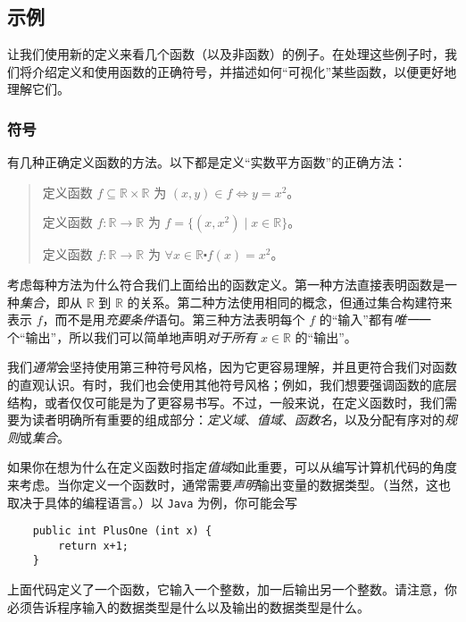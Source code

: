 
\subsection{示例}

让我们使用新的定义来看几个函数（以及非函数）的例子。在处理这些例子时，我们将介绍定义和使用函数的正确符号，并描述如何``可视化''某些函数，以便更好地理解它们。

\subsubsection*{符号}

有几种正确定义函数的方法。以下都是定义``实数平方函数''的正确方法：
\begin{quotation}
    定义函数 $f \subseteq \mathbb{R} \times \mathbb{R}$ 为 $(x, y) \in f \iff y = x^2$。

    定义函数 $f : \mathbb{R} \to \mathbb{R}$ 为 $f=\big\{(x,x^2) \mid x \in \mathbb{R}\big\}$。

    定义函数 $f : \mathbb{R} \to \mathbb{R}$ 为 $\forall x \in \mathbb{R} \centerdot f(x) = x^2$。
\end{quotation}
考虑每种方法为什么符合我们上面给出的函数定义。第一种方法直接表明函数是一种\emph{集合}，即从 $\mathbb{R}$ 到 $\mathbb{R}$ 的关系。第二种方法使用相同的概念，但通过集合构建符来表示 $f$，而不是用\emph{充要条件}语句。第三种方法表明每个 $f$ 的``输入''都有\emph{唯一}一个``输出''，所以我们可以简单地声明\emph{对于所有} $x \in \mathbb{R}$ 的``输出''。

我们\emph{通常}会坚持使用第三种符号风格，因为它更容易理解，并且更符合我们对函数的直观认识。有时，我们也会使用其他符号风格；例如，我们想要强调函数的底层结构，或者仅仅可能是为了更容易书写。不过，一般来说，在定义函数时，我们需要为读者明确所有重要的组成部分：\emph{定义域}、\emph{值域}、\emph{函数名}，以及分配有序对的\emph{规则}或\emph{集合}。

如果你在想为什么在定义函数时指定\emph{值域}如此重要，可以从编写计算机代码的角度来考虑。当你定义一个函数时，通常需要\emph{声明}输出变量的数据类型。（当然，这也取决于具体的编程语言。）以 \verb|Java| 为例，你可能会写
\begin{verbatim}
    public int PlusOne (int x) {
        return x+1;
    }
\end{verbatim}
上面代码定义了一个函数，它输入一个整数，加一后输出另一个整数。请注意，你必须告诉程序输入的数据类型是什么以及输出的数据类型是什么。\\


